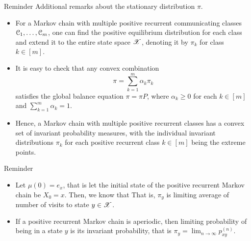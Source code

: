 \documentclass[12pt,aspectratio=169]{beamer}
\begin{document}
\begin{frame}
\begin{block}{Reminder} 
Additional remarks about the stationary distribution $\pi$. 
\begin{itemize}
    \item For a Markov chain with multiple positive recurrent communicating classes $\mathcal{C}_1, \dots, \mathcal{C}_m$, one can find the positive equilibrium distribution for each class and extend it to the entire state space $\mathscr{X}$, denoting it by $\pi_k$ for class $k \in [m]$.
    
    \item<2-> It is easy to check that any convex combination
    \[
    \pi = \sum_{k = 1}^m \alpha_k \pi_k
    \]
    satisfies the global balance equation $\pi = \pi P$, where $\alpha_k \ge 0$ for each $k \in [m]$ and $\sum_{k=1}^m \alpha_k = 1$.
    
    \item<3-> Hence, a Markov chain with multiple positive recurrent classes has a convex set of invariant probability measures, with the individual invariant distributions $\pi_k$ for each positive recurrent class $k \in [m]$ being the extreme points. 
\end{itemize}
\end{block}
\end{frame}


\begin{frame}
\begin{block}{Reminder}
\begin{itemize}
\item Let $\mu(0) = e_x$, that is let the initial state of the positive recurrent Markov chain be $X_0 = x$. Then, we know that %
That is, $\pi_y$ is limiting average of number of visits to state $y \in \mathscr{X}$. 

\item<2-> If a positive recurrent Markov chain is aperiodic, then limiting probability of being in a state $y$ is its invariant probability, 
that is $\pi_y = \lim_{n \to \infty}p_{xy}^{(n)}$. 
\end{itemize}
\end{block}
\end{frame}
\end{document}

